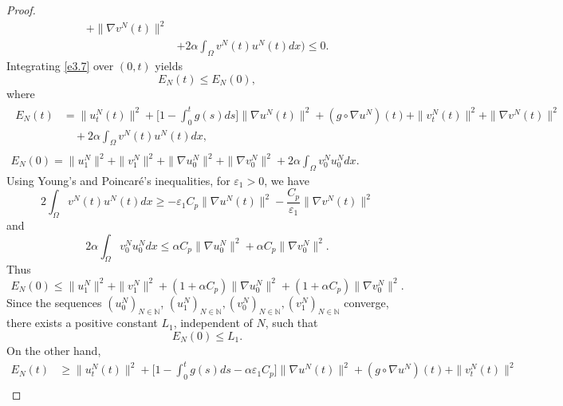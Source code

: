 \documentclass[10pt,a4paper]{amsart}
\numberwithin{equation}{section}
\begin{document}
\begin{proof}
\begin{equation}
\begin{aligned}
 + \| \nabla v^N (t)\|^2 \\
&+ 2 \alpha \int_{\Omega} v^N(t) u^N(t) dx\Big)\leq 0.
\end{aligned} \label{e3.7}
\end{equation}
Integrating \eqref{e3.7} over $(0, t)$ yields
\begin{equation}
 E_N(t)\leq E_N(0), \label{e3.8}
\end{equation}
where
 \begin{gather*}
 \begin{aligned}
E_N(t)&=\| u^N_{t} (t) \|^2 + \Big[ 1-\int_0^t g(s)ds\Big] \| \nabla u^N(t) \|^2 +(g\circ\nabla u^N)(t)
 +\| v^N_{t}(t) \|^2 + \| \nabla v^N(t) \|^2\\
&\quad + 2 \alpha \int_{\Omega} v^N(t) u^N(t) dx,
\end{aligned}\\
E_N(0)= \| u^N_{1} \|^2 + \| v^N_{1} \|^2 +\| \nabla u^N_0 \|^2
 +\| \nabla v^N_0 \|^2+ 2 \alpha \int_{\Omega} v^N_0 u^N_0 dx.
\end{gather*}
Using Young's and Poincar\'e's inequalities, for $\varepsilon_{1}> 0$, we have
 \begin{equation}
 2\int_{\Omega} v^N(t) u^N(t) dx\geq - \varepsilon_{1} C_p\| \nabla u^N (t) \|^2 - \frac{C_p}{\varepsilon_{1}} \| \nabla v^N (t) \|^2
 \label{e3.9}
 \end{equation}
and
 \begin{equation}
 2 \alpha \int_{\Omega} v^N_0 u^N_0 dx\leq \alpha C_p\| \nabla u^N_0 \|^2 + \alpha C_p \| \nabla v^N_0 \|^2.
 \label{e3.10}
 \end{equation}
Thus
\begin{equation}
 E_N(0)\leq \| u^N_{1} \|^2 + \| v^N_{1} \|^2 +(1+\alpha C_p)\| \nabla u^N_0 \|^2 +(1+\alpha C_p)\| \nabla v^N_0 \|^2.\label{e3.11}
 \end{equation}
Since the sequences $ (u_0^N)_{N \in \mathbb{N}}$,
$ (u_1^N)_{N \in \mathbb{N}}, (v_0^N)_{N \in \mathbb{N}}, (v_1^N)_{N \in \mathbb{N}} $ converge, there exists a positive constant $L_{1}$, independent of $N$, such that
\begin{equation}
E_N(0)\leq L_{1}.\label{e3.12}
\end{equation}
On the other hand,
\begin{equation}
\begin{aligned}
E_N(t)
&\geq \| u^N_{t}(t) \|^2 + \Big[ 1-\int_0^t g(s)ds -\alpha \varepsilon_{1} C_p \Big]
 \| \nabla u^N(t) \|^2 +(g\circ\nabla u^N)(t)+\| v^N_{t} (t) \|^2 \\

\end{aligned}
\end{equation}
\end{proof}
\end{document}
